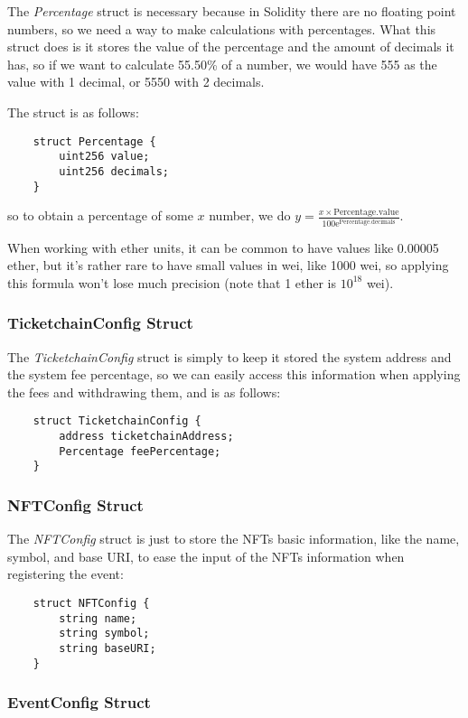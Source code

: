 The \textit{Percentage} struct is necessary because in Solidity there are no floating point numbers, so we need a way to make calculations with percentages. What this struct does is it stores the value of the percentage and the amount of decimals it has, so if we want to calculate 55.50\% of a number, we would have 555 as the value with 1 decimal, or 5550 with 2 decimals.

The struct is as follows:
\begin{verbatim}
    struct Percentage {
        uint256 value;
        uint256 decimals;
    }
\end{verbatim}
so to obtain a percentage of some $x$ number, we do $y = \frac{x \times \text{Percentage.value}}{100\mathrm{e}^\text{Percentage.decimals}}$.

When working with ether units, it can be common to have values like 0.00005 ether, but it's rather rare to have small values in wei, like 1000 wei, so applying this formula won't lose much precision (note that 1 ether is $10^{18}$ wei).

\subsubsection{TicketchainConfig Struct}

The \textit{TicketchainConfig} struct is simply to keep it stored the system address and the system fee percentage, so we can easily access this information when applying the fees and withdrawing them, and is as follows:
\begin{verbatim}
    struct TicketchainConfig {
        address ticketchainAddress;
        Percentage feePercentage;
    }
\end{verbatim}

\subsubsection{NFTConfig Struct}

The \textit{NFTConfig} struct is just to store the NFTs basic information, like the name, symbol, and base URI, to ease the input of the NFTs information when registering the event:
\begin{verbatim}
    struct NFTConfig {
        string name;
        string symbol;
        string baseURI;
    }
\end{verbatim}

\subsubsection{EventConfig Struct}

